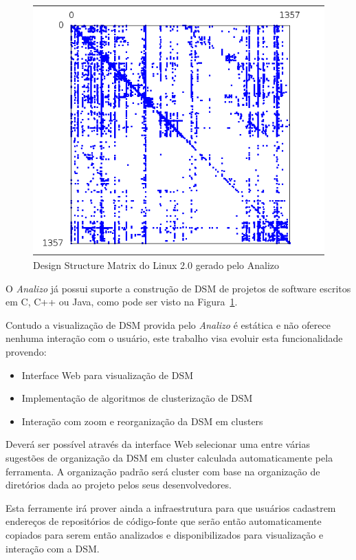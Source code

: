 \documentclass{article}
\begin{document}
\begin{figure}[h]
\center
\includegraphics[scale=0.5]{linux.png}
\caption{Design Structure Matrix do Linux 2.0 gerado pelo Analizo}
\label{fig:dsm}
\end{figure}

O {\it Analizo} já possui suporte a construção de DSM de projetos de software
escritos em C, C++ ou Java, como pode ser visto na Figura~\ref{fig:dsm}.

Contudo a visualização de DSM provida pelo {\it Analizo} é estática e não
oferece nenhuma interação com o usuário, este trabalho visa evoluir esta
funcionalidade provendo:

\begin{itemize}
  \item Interface Web para visualização de DSM
  \item Implementação de algoritmos de clusterização de DSM
  \item Interação com zoom e reorganização da DSM em clusters
\end{itemize}

Deverá ser possível através da interface Web selecionar uma entre várias
sugestões de organização da DSM em cluster calculada automaticamente pela
ferramenta. A organização padrão será cluster com base na organização de
diretórios dada ao projeto pelos seus desenvolvedores.

Esta ferramente irá prover ainda a infraestrutura para que usuários cadastrem
endereços de repositórios de código-fonte que serão então automaticamente
copiados para serem então analizados e disponibilizados para visualização e
interação com a DSM.
\end{document}
